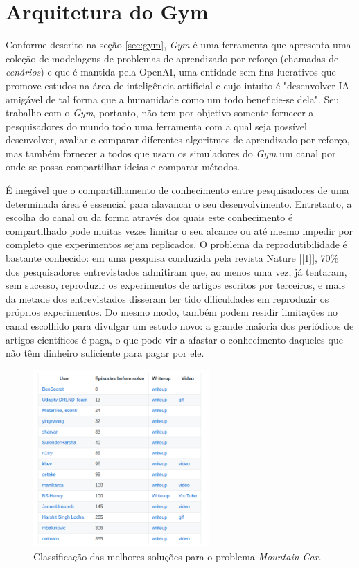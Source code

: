 \documentclass[cic,tc]{iiufrgs}
\begin{document}
\section{Arquitetura do Gym}

Conforme descrito na seção \ref{sec:gym}, \textit{Gym} é uma ferramenta que
apresenta uma coleção de modelagens de problemas de aprendizado por reforço
(chamadas de \textit{cenários}) e que é mantida pela OpenAI, uma entidade sem
fins lucrativos que promove estudos na área de inteligência artificial e cujo
intuito é "desenvolver IA amigável de tal forma que a humanidade como um todo
beneficie-se dela". Seu trabalho com o \textit{Gym}, portanto, não tem por
objetivo somente fornecer a pesquisadores do mundo todo uma ferramenta com a
qual seja possível desenvolver, avaliar e comparar diferentes algoritmos de
aprendizado por reforço, mas também fornecer a todos que usam os simuladores do
\textit{Gym} um canal por onde se possa compartilhar ideias e comparar métodos.


É inegável que o compartilhamento de conhecimento entre pesquisadores de uma
determinada área é essencial para alavancar o seu desenvolvimento. Entretanto, a
escolha do canal ou da forma através dos quais este conhecimento é compartilhado
pode muitas vezes limitar o seu alcance ou até mesmo impedir por completo que
experimentos sejam replicados. O problema da reprodutibilidade é bastante
conhecido: em uma pesquisa conduzida pela revista Nature [[1]], 70\% dos
pesquisadores entrevistados admitiram que, ao menos uma vez, já tentaram, sem
sucesso, reproduzir os experimentos de artigos escritos por terceiros, e mais da
metade dos entrevistados disseram ter tido dificuldades em reproduzir os
próprios experimentos. Do mesmo modo, também podem residir limitações no canal
escolhido para divulgar um estudo novo: a grande maioria dos periódicos de
artigos científicos é paga, o que pode vir a afastar o conhecimento daqueles que
não têm dinheiro suficiente para pagar por ele.


\begin{figure}[h]
    \caption{Classificação das melhores soluções para o problema
    \textit{Mountain Car}.}
    \begin{center}
      \includegraphics[width=0.6\textwidth]{leaderboard.png}
    \end{center}
    \label{fig:leaderboard}
\end{figure}
\end{document}
